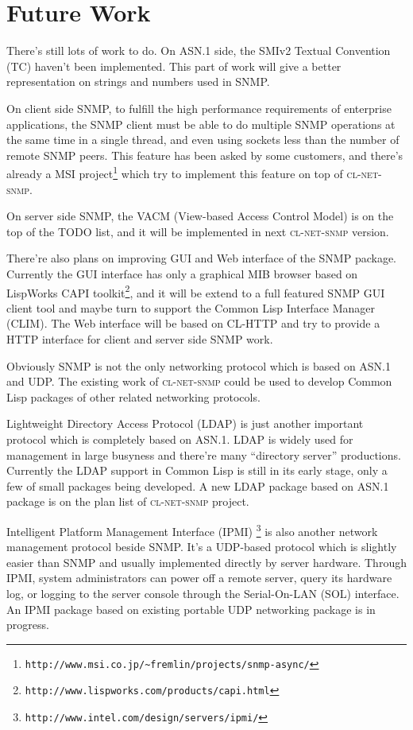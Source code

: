 \documentclass[reprint,natbib,9pt]{sigplanconf}
\begin{document}
\section{Future Work}

There's still lots of work to do. On ASN.1 side, the SMIv2
Textual Convention (TC) \cite{RFC:2579} haven't been implemented.
This part of work
will give a better representation on strings and numbers used in
SNMP.

On client side SNMP, to fulfill the high performance requirements
of enterprise applications, the SNMP client must be able to do
multiple SNMP operations at the same
time in a single thread, and even using sockets less than the number
of remote SNMP peers. This feature has been asked by some customers,
and there's already a MSI project\footnote{
\texttt{http://www.msi.co.jp/\~{}fremlin/projects/snmp-async/}} which try
to implement this feature on top of \textsc{cl-net-snmp}.

On server side SNMP, the VACM (View-based Access
Control Model) \cite{RFC:3415} is on the top of the TODO
list, and it will be implemented in next \textsc{cl-net-snmp} version.

There're also plans on improving GUI and Web interface of the SNMP package.
Currently the GUI interface has only a graphical MIB browser based on
LispWorks CAPI toolkit\footnote{
\texttt{http://www.lispworks.com/products/capi.html}}, and it will be
extend to a full featured SNMP GUI client tool and maybe turn to
support the Common Lisp Interface Manager (CLIM). The Web interface
will be based on CL-HTTP and try to provide a HTTP interface for client and 
server side SNMP work.

Obviously SNMP is not the only networking protocol which is based on
ASN.1 and UDP.  The existing work of \textsc{cl-net-snmp} could be
used to develop Common Lisp packages of other related networking
protocols.

Lightweight Directory Access Protocol (LDAP) \cite{RFC:4510}
is just another important
protocol which is completely based on ASN.1. LDAP is widely used for
management in large busyness and there're many ``directory server''
productions. Currently the LDAP support in Common Lisp is still in its
early stage, only a few of small packages being developed. A new LDAP
package based on ASN.1 package is on the plan list of
\textsc{cl-net-snmp} project.

Intelligent Platform Management Interface (IPMI) \footnote{
\texttt{http://www.intel.com/design/servers/ipmi/}} is also
another network management protocol beside SNMP. It's a UDP-based
protocol which is slightly easier than SNMP and usually implemented
directly by server hardware. Through IPMI, system administrators can
power off a remote server, query its hardware log, or logging to the
server console through the Serial-On-LAN (SOL) interface. An IPMI
package based on existing portable UDP networking package is in
progress.
\end{document}
